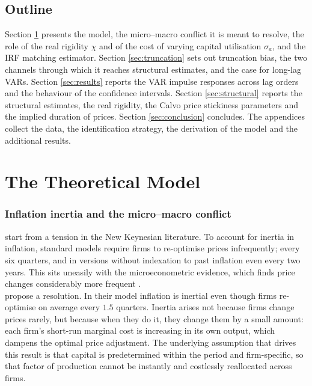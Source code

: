 \documentclass[12pt, a4paper]{article}
\begin{document}
\subsection*{Outline}

Section \ref{sec:model} presents the model, the micro--macro conflict it is meant to resolve, the
role of the real rigidity $\chi$ and of the cost of varying capital utilisation $\sigma_a$, and the
IRF matching estimator. Section \ref{sec:truncation} sets out truncation bias, the two channels
through which it reaches structural estimates, and the case for long-lag VARs. Section
\ref{sec:results} reports the VAR impulse responses across lag orders and the behaviour of the
confidence intervals. Section \ref{sec:structural} reports the structural estimates, the real
rigidity, the Calvo price stickiness parameters and the implied duration of prices. Section
\ref{sec:conclusion} concludes. The appendices collect the data, the identification strategy, the
derivation of the model and the additional results.

\section{The Theoretical Model}
\label{sec:model}

\subsubsection*{Inflation inertia and the micro--macro conflict}

\citet{ACEL2011} start from a tension in the New Keynesian literature. To account for inertia
in inflation, standard models require firms to re-optimise prices infrequently; every six
quarters, and in versions without indexation to past inflation even every two years. This sits
uneasily with the microeconometric evidence, which finds price changes considerably more
frequent \citep{BilsKlenow2004, GolosovLucas2007, KlenowKryvtsov2008}.
\\

\citet{ACEL2005WP} propose a resolution. In their model inflation is inertial even though
firms re-optimise on average every $1.5$ quarters. Inertia arises not because firms change
prices rarely, but because when they do it, they change them by a small amount: each firm's
short-run marginal cost is increasing in its own output, which dampens the optimal price
adjustment. The underlying assumption that drives this result is that capital is predetermined within the period
and firm-specific, so that factor of production cannot be instantly and costlessly reallocated across firms.
\end{document}
